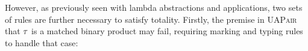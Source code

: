 \begin{mathpar}



\end{mathpar}

However, as previously seen with lambda abstractions and applications, two sets of rules are further
necessary to satisfy totality. Firstly, the premise in \textsc{UAPair} that $\TMV$ is a matched
binary product may fail, requiring marking and typing rules to handle that case:
%
\begin{mathpar}

\end{mathpar}

